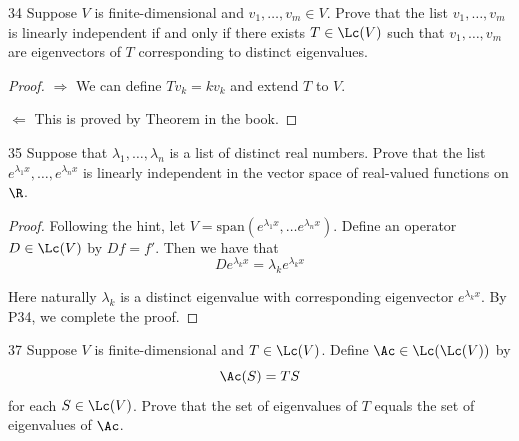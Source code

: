\documentclass{extarticle}
\begin{document}
\begin{problem}{34}
    Suppose \(V\) is finite-dimensional and \(v_1, \ldots, v_m \in V\). Prove that 
    the list \(v_1, \ldots, v_m\) is linearly independent if and only if there 
    exists \(T \in \Lc(V)\) such that \(v_1, \ldots, v_m\) are eigenvectors of \(T\)
    corresponding to distinct eigenvalues. 
\end{problem}

\begin{proof}
\(\Rightarrow\) We can define \(Tv_k = k v_k\) and extend \(T\) to \(V\). 

\(\Leftarrow\) This is proved by Theorem in the book.
\end{proof}

\begin{problem}{35}
    Suppose that \(\lambda_1, \ldots, \lambda_n\) is a list of distinct real numbers. Prove that 
    the list \(e^{\lambda_1 x}, \ldots, e^{\lambda_n x}\) is linearly independent in the vector 
    space of real-valued functions on \(\R\).
\end{problem}

\begin{proof}
Following the hint, let \(V = \text{span}(e^{\lambda_1 x}, \ldots e^{\lambda_n x})\). Define 
an operator \(D \in \Lc(V)\) by \(Df = f'\). Then we have that 
\[D e^{\lambda_k x} = \lambda_k e^{\lambda_k x}\]

Here naturally \(\lambda_k\) is a distinct eigenvalue with corresponding eigenvector \(e^{\lambda_k x}\). 
By P34, we complete the proof. 
\end{proof}

\begin{problem}{37}
    Suppose \(V\) is finite-dimensional and \(T \in \Lc(V)\). Define \(\Ac \in \Lc(\Lc(V))\) by 
    \[\Ac(S) = TS\]
    for each \(S \in \Lc(V)\). Prove that the set of eigenvalues of \(T\) equals the set of 
    eigenvalues of \(\Ac\).
\end{problem}
\end{document}
